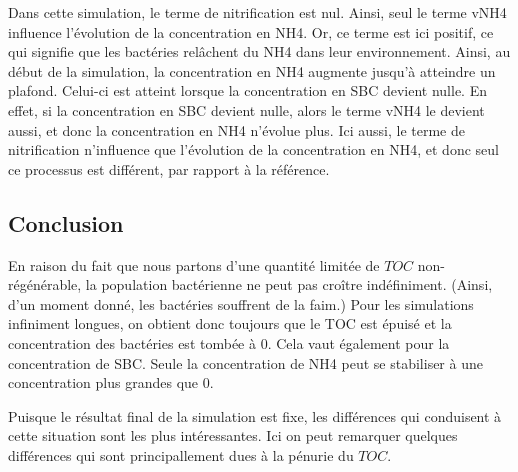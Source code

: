 \par{
Dans cette simulation, le terme de nitrification est nul. Ainsi, seul le terme vNH4 influence l'\'evolution de
la concentration en NH4. Or, ce terme est ici positif, ce qui signifie que les bact\'eries rel\^achent du NH4
dans leur environnement. Ainsi, au d\'ebut de la simulation, la concentration en NH4 augmente jusqu'\`a
atteindre un plafond. Celui-ci est atteint lorsque la concentration en SBC devient nulle. En effet, si la
concentration en SBC devient nulle, alors le terme vNH4 le devient aussi, et donc la concentration en NH4
n'\'evolue plus. Ici aussi, le terme de nitrification n'influence que l'\'evolution de la concentration en
NH4, et donc seul ce processus est diff\'erent, par rapport \`a la r\'ef\'erence.
}

\FloatBarrier
\newpage
\subsection{Conclusion}
\par{
En raison du fait que nous partons d'une quantité limitée de $TOC$ non-régénérable, la population bactérienne
ne peut pas croître indéfiniment. (Ainsi, d'un moment donné, les bactéries souffrent de la faim.)
Pour les simulations infiniment longues, on obtient donc toujours que le TOC est épuisé et la
concentration des bactéries est tombée à $0$. Cela vaut également pour la concentration de SBC.
Seule la concentration de NH4 peut se stabiliser à une concentration plus grandes que $0$.
}
\par{
Puisque le résultat final de la simulation est fixe, les différences qui conduisent à cette situation
sont les plus intéressantes. Ici on peut remarquer quelques différences qui sont principallement dues à
la pénurie du $TOC$. \todo
}
